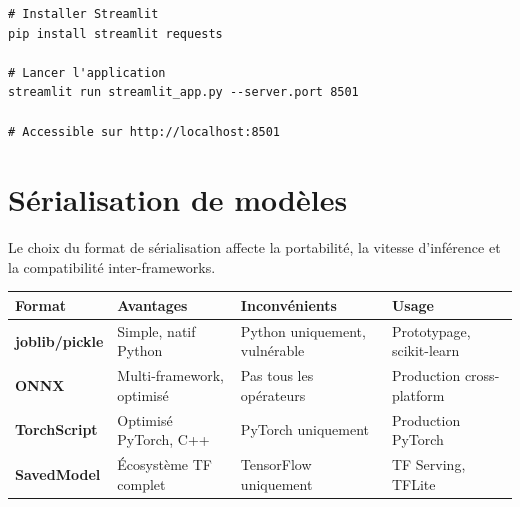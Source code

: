 \begin{codeblock}[title=\textbf{Lancer le dashboard Streamlit}]
\begin{verbatim}
# Installer Streamlit
pip install streamlit requests

# Lancer l'application
streamlit run streamlit_app.py --server.port 8501

# Accessible sur http://localhost:8501
\end{verbatim}
\end{codeblock}

\section{S\'erialisation de mod\`eles}
\label{sec:serialization}

Le choix du format de s\'erialisation affecte la portabilit\'e, la vitesse
d'inf\'erence et la compatibilit\'e inter-frameworks.

\begin{formules}[title=\textbf{Formats de s\'erialisation}]
\begin{tabular}{@{}lp{3.5cm}p{3.5cm}p{3cm}@{}}
\toprule
\textbf{Format} & \textbf{Avantages} & \textbf{Inconv\'enients} & \textbf{Usage} \\
\midrule
\textbf{joblib/pickle} & Simple, natif Python & Python uniquement,
  vuln\'erable & Prototypage, scikit-learn \\
\textbf{ONNX} & Multi-framework, optimis\'e & Pas tous les op\'erateurs &
  Production cross-platform \\
\textbf{TorchScript} & Optimis\'e PyTorch, C++ & PyTorch uniquement &
  Production PyTorch \\
\textbf{SavedModel} & \'Ecosyst\`eme TF complet & TensorFlow uniquement &
  TF Serving, TFLite \\
\bottomrule
\end{tabular}
\end{formules}

